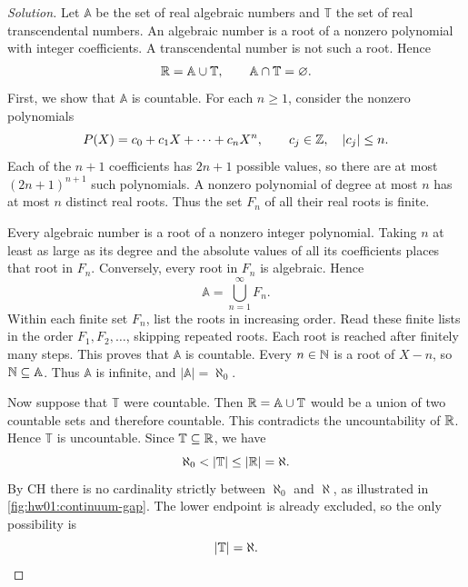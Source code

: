 
\begin{proof}[Solution]
Let $\mathbb{A}$ be the set of real algebraic numbers and
$\mathbb{T}$ the set of real transcendental numbers. An algebraic
number is a root of a nonzero polynomial with integer coefficients.
A transcendental number is not such a root. Hence
\[
  \mathbb{R}=\mathbb{A}\cup\mathbb{T},
  \qquad\mathbb{A}\cap\mathbb{T}=\varnothing.
\]
First, we show that $\mathbb{A}$ is countable. For each $n\ge1$,
consider the nonzero polynomials
\[
  P(X)=c_0+c_1X+\cdots+c_nX^n,
  \qquad c_j\in\mathbb{Z},\quad |c_j|\le n.
\]
Each of the $n+1$ coefficients has $2n+1$ possible values, so
there are at most $(2n+1)^{n+1}$ such polynomials.
A nonzero polynomial of degree at most $n$ has at most $n$
distinct real roots. Thus the set $F_n$ of all their real roots
is finite.

Every algebraic number is a root of a nonzero integer polynomial.
Taking $n$ at least as large as its degree and the absolute values
of all its coefficients places that root in $F_n$.
Conversely, every root in $F_n$ is algebraic. Hence
\[
  \mathbb{A}=\bigcup_{n=1}^{\infty}F_n.
\]
Within each finite set $F_n$, list the roots in increasing order.
Read these finite lists in the order $F_1,F_2,\ldots$, skipping
repeated roots. Each root is reached after finitely many steps.
This proves that $\mathbb{A}$ is countable. Every $n\in\mathbb{N}$
is a root of $X-n$, so $\mathbb{N}\subseteq\mathbb{A}$. Thus
$\mathbb{A}$ is infinite, and $|\mathbb{A}|=\aleph_0$.

\begin{marginfigure}
  \centering
  
  \caption[The continuum hypothesis.]{CH excludes intermediate cardinalities. Since
    $\mathbb{T}$ is uncountable and contained in $\R$, its cardinality
    must equal $\aleph$.}
  \label{fig:hw01:continuum-gap}
\end{marginfigure}

Now suppose that $\mathbb{T}$ were countable. Then
$\mathbb{R}=\mathbb{A}\cup\mathbb{T}$ would be a union of two countable
sets and therefore countable. This contradicts the uncountability
of $\R$. Hence $\mathbb{T}$ is uncountable. Since
$\mathbb{T}\subseteq\mathbb{R}$, we have
\[
  \aleph_0<|\mathbb{T}|\le|\R|=\aleph.
\]
By CH there is no cardinality strictly between $\aleph_0$ and
$\aleph$, as illustrated in \autoref{fig:hw01:continuum-gap}.
The lower endpoint is already excluded, so the only possibility is
\[
  |\mathbb{T}|=\aleph.\qedhere
\]
\end{proof}
